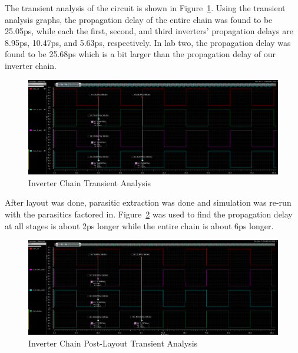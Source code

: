\documentclass[12pt]{article}
\begin{document}
The transient analysis of the circuit is shown in Figure~\ref{fig:inv_chain_tran}. Using the transient analysis graphs,
the propagation delay of the entire chain was found to be 25.05ps, while each the first, second, and third
inverters' propagation delays are 8.95ps, 10.47ps, and 5.63ps, respectively. In lab two, the propagation delay was found to be
25.68ps which is a bit larger than the propagation delay of our inverter chain.
\begin{figure}[!htb]
    \centering
    \includegraphics[width=5in]{figures/inv_chain_tran.png}
    \caption{Inverter Chain Transient Analysis}\label{fig:inv_chain_tran}
\end{figure}

After layout was done, parasitic extraction was done and simulation was re-run with the parasitics factored in. 
Figure~\ref{fig:inv_chain_post_layout_tran} was used to find the propagation delay at all stages is about 2ps longer
while the entire chain is about 6ps longer. 
\begin{figure}[!htb]
    \centering
    \includegraphics[width=5in]{figures/inv_chain_post_layout_tran.png}
    \caption{Inverter Chain Post-Layout Transient Analysis}\label{fig:inv_chain_post_layout_tran}
\end{figure}
\end{document}

